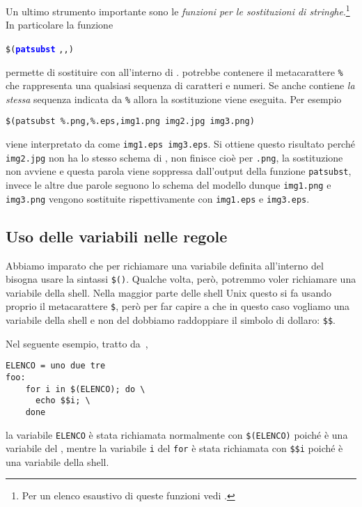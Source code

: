 Un ultimo strumento importante sono le
\emph{funzioni per le sostituzioni di
  stringhe}.\footnote{Per
  un elenco esaustivo di queste funzioni vedi \cite[pagina 80]{gnu:make}.}
In particolare la funzione
\begin{sintassi}
  \small \texttt{\$(\textcolor{blue}{\textbf{patsubst}}}
  \texttt{,}\texttt{,}\texttt{)}
\end{sintassi}
permette di sostituire  con  all'interno di
.   potrebbe contenere il metacarattere \texttt{\%}
che rappresenta una qualsiasi sequenza di caratteri e numeri.  Se anche
 contiene \emph{la stessa} sequenza indicata da \texttt{\%}
allora la sostituzione viene eseguita.  Per esempio
\begin{lstlisting}
$(patsubst %.png,%.eps,img1.png img2.jpg img3.png)
\end{lstlisting} %
viene interpretato da  come \texttt{img1.eps img3.eps}.  Si
ottiene questo risultato perché \texttt{img2.jpg} non ha lo stesso schema di
, non finisce cioè per \texttt{.png}, la sostituzione non avviene
e questa parola viene soppressa dall'output della funzione \texttt{patsubst},
invece le altre due parole seguono lo schema del modello dunque
\texttt{img1.png} e \texttt{img3.png} vengono sostituite rispettivamente con
\texttt{img1.eps} e \texttt{img3.eps}.

\subsection{Uso delle variabili nelle regole}
\label{sec:uso-variabili}

Abbiamo imparato che per richiamare una variabile definita all'interno del
 bisogna usare la sintassi
\texttt{\$(}\texttt{)}.  Qualche volta, però,
potremmo voler richiamare una variabile della shell.  Nella maggior parte delle
shell Unix questo si fa usando proprio il metacarattere \texttt{\$}, però per
far capire a  che in questo caso vogliamo una variabile della
shell e non del  dobbiamo raddoppiare il simbolo di dollaro:
\texttt{\$\$}.

Nel seguente esempio, tratto da~\cite[pagina 43]{gnu:make},
\begin{lstlisting}
ELENCO = uno due tre
foo:
	for i in $(ELENCO); do \
	  echo $$i; \
	done
\end{lstlisting}
la variabile \texttt{ELENCO} è stata richiamata normalmente con
\texttt{\$(ELENCO)} poiché è una variabile del , mentre la
variabile \texttt{i} del \texttt{for} è stata richiamata con \texttt{\$\$i}
poiché è una variabile della shell.

